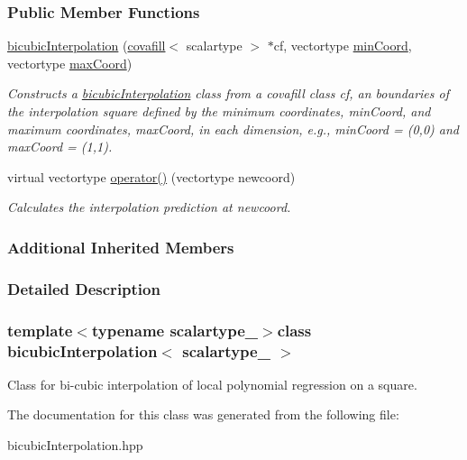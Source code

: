 \subsubsection*{Public Member Functions}
\begin{DoxyCompactItemize}
\item 
\hypertarget{classbicubicInterpolation_a1f0aee534884e0679c56ac069218dd71}{}\hyperlink{classbicubicInterpolation_a1f0aee534884e0679c56ac069218dd71}{bicubic\+Interpolation} (\hyperlink{classcovafill}{covafill}$<$ scalartype $>$ $\ast$cf, vectortype \hyperlink{classncubicInterpolation_a5360669149e2182a478f74941c4fb008}{min\+Coord}, vectortype \hyperlink{classncubicInterpolation_a3bd706effb987f94c92f4c89605c7e7c}{max\+Coord})\label{classbicubicInterpolation_a1f0aee534884e0679c56ac069218dd71}

\begin{DoxyCompactList}\small\item\em Constructs a \hyperlink{classbicubicInterpolation}{bicubic\+Interpolation} class from a covafill class {\itshape cf}, an boundaries of the interpolation square defined by the minimum coordinates, {\itshape min\+Coord}, and maximum coordinates, {\itshape max\+Coord}, in each dimension, e.\+g., min\+Coord = (0,0) and max\+Coord = (1,1). \end{DoxyCompactList}\item 
\hypertarget{classbicubicInterpolation_a9b5aab51903b774190b8806f85b65a2a}{}virtual vectortype \hyperlink{classbicubicInterpolation_a9b5aab51903b774190b8806f85b65a2a}{operator()} (vectortype newcoord)\label{classbicubicInterpolation_a9b5aab51903b774190b8806f85b65a2a}

\begin{DoxyCompactList}\small\item\em Calculates the interpolation prediction at {\itshape newcoord}. \end{DoxyCompactList}\end{DoxyCompactItemize}
\subsubsection*{Additional Inherited Members}


\subsubsection{Detailed Description}
\subsubsection*{template$<$typename scalartype\+\_\+$>$class bicubic\+Interpolation$<$ scalartype\+\_\+ $>$}

Class for bi-\/cubic interpolation of local polynomial regression on a square. 

The documentation for this class was generated from the following file\+:\begin{DoxyCompactItemize}
\item 
bicubic\+Interpolation.\+hpp\end{DoxyCompactItemize}
